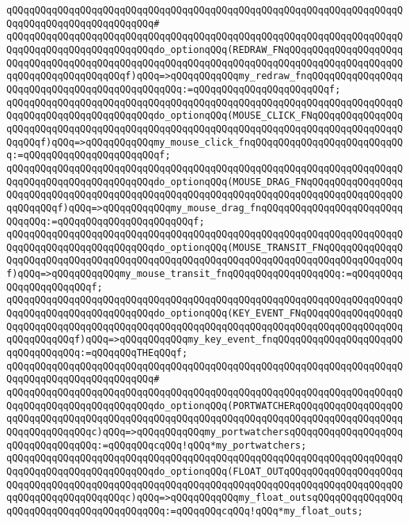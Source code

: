 \verb|qQQqqQQqqQQqqQQqqQQqqQQqqQQqqQQqqQQqqQQqqQQqqQQqqQQqqQQqqQQqqQQqqQQqqQQqqQQqqQQqqQQqqQQqqQQqqQQq#|\newline
\verb|qQQqqQQqqQQqqQQqqQQqqQQqqQQqqQQqqQQqqQQqqQQqqQQqqQQqqQQqqQQqqQQqqQQqqQQqqQQqqQQqqQQqqQQqqQQqqQQqdo_optionqQQq(REDRAW_FNqQQqqQQqqQQqqQQqqQQqqQQqqQQqqQQqqQQqqQQqqQQqqQQqqQQqqQQqqQQqqQQqqQQqqQQqqQQqqQQqqQQqqQQqqQQqqQQqqQQqqQQqqQQqqQQqf)qQQq=>qQQqqQQqqQQqmy_redraw_fnqQQqqQQqqQQqqQQqqQQqqQQqqQQqqQQqqQQqqQQqqQQqqQQq:=qQQqqQQqqQQqqQQqqQQqqQQqf;|\newline
\verb|qQQqqQQqqQQqqQQqqQQqqQQqqQQqqQQqqQQqqQQqqQQqqQQqqQQqqQQqqQQqqQQqqQQqqQQqqQQqqQQqqQQqqQQqqQQqqQQqdo_optionqQQq(MOUSE_CLICK_FNqQQqqQQqqQQqqQQqqQQqqQQqqQQqqQQqqQQqqQQqqQQqqQQqqQQqqQQqqQQqqQQqqQQqqQQqqQQqqQQqqQQqqQQqqQQqf)qQQq=>qQQqqQQqqQQqmy_mouse_click_fnqQQqqQQqqQQqqQQqqQQqqQQqqQQq:=qQQqqQQqqQQqqQQqqQQqqQQqf;|\newline
\verb|qQQqqQQqqQQqqQQqqQQqqQQqqQQqqQQqqQQqqQQqqQQqqQQqqQQqqQQqqQQqqQQqqQQqqQQqqQQqqQQqqQQqqQQqqQQqqQQqdo_optionqQQq(MOUSE_DRAG_FNqQQqqQQqqQQqqQQqqQQqqQQqqQQqqQQqqQQqqQQqqQQqqQQqqQQqqQQqqQQqqQQqqQQqqQQqqQQqqQQqqQQqqQQqqQQqqQQqf)qQQq=>qQQqqQQqqQQqmy_mouse_drag_fnqQQqqQQqqQQqqQQqqQQqqQQqqQQqqQQq:=qQQqqQQqqQQqqQQqqQQqqQQqf;|\newline
\verb|qQQqqQQqqQQqqQQqqQQqqQQqqQQqqQQqqQQqqQQqqQQqqQQqqQQqqQQqqQQqqQQqqQQqqQQqqQQqqQQqqQQqqQQqqQQqqQQqdo_optionqQQq(MOUSE_TRANSIT_FNqQQqqQQqqQQqqQQqqQQqqQQqqQQqqQQqqQQqqQQqqQQqqQQqqQQqqQQqqQQqqQQqqQQqqQQqqQQqqQQqqQQqf)qQQq=>qQQqqQQqqQQqmy_mouse_transit_fnqQQqqQQqqQQqqQQqqQQq:=qQQqqQQqqQQqqQQqqQQqqQQqf;|\newline
\verb|qQQqqQQqqQQqqQQqqQQqqQQqqQQqqQQqqQQqqQQqqQQqqQQqqQQqqQQqqQQqqQQqqQQqqQQqqQQqqQQqqQQqqQQqqQQqqQQqdo_optionqQQq(KEY_EVENT_FNqQQqqQQqqQQqqQQqqQQqqQQqqQQqqQQqqQQqqQQqqQQqqQQqqQQqqQQqqQQqqQQqqQQqqQQqqQQqqQQqqQQqqQQqqQQqqQQqqQQqf)qQQq=>qQQqqQQqqQQqmy_key_event_fnqQQqqQQqqQQqqQQqqQQqqQQqqQQqqQQqqQQq:=qQQqqQQqTHEqQQqf;|\newline
\verb|qQQqqQQqqQQqqQQqqQQqqQQqqQQqqQQqqQQqqQQqqQQqqQQqqQQqqQQqqQQqqQQqqQQqqQQqqQQqqQQqqQQqqQQqqQQqqQQq#|\newline
\verb|qQQqqQQqqQQqqQQqqQQqqQQqqQQqqQQqqQQqqQQqqQQqqQQqqQQqqQQqqQQqqQQqqQQqqQQqqQQqqQQqqQQqqQQqqQQqqQQqdo_optionqQQq(PORTWATCHERqQQqqQQqqQQqqQQqqQQqqQQqqQQqqQQqqQQqqQQqqQQqqQQqqQQqqQQqqQQqqQQqqQQqqQQqqQQqqQQqqQQqqQQqqQQqqQQqqQQqqQQqc)qQQq=>qQQqqQQqqQQqmy_portwatchersqQQqqQQqqQQqqQQqqQQqqQQqqQQqqQQqqQQq:=qQQqqQQqcqQQq!qQQq*my_portwatchers;|\newline
\verb|qQQqqQQqqQQqqQQqqQQqqQQqqQQqqQQqqQQqqQQqqQQqqQQqqQQqqQQqqQQqqQQqqQQqqQQqqQQqqQQqqQQqqQQqqQQqqQQqdo_optionqQQq(FLOAT_OUTqQQqqQQqqQQqqQQqqQQqqQQqqQQqqQQqqQQqqQQqqQQqqQQqqQQqqQQqqQQqqQQqqQQqqQQqqQQqqQQqqQQqqQQqqQQqqQQqqQQqqQQqqQQqqQQqc)qQQq=>qQQqqQQqqQQqmy_float_outsqQQqqQQqqQQqqQQqqQQqqQQqqQQqqQQqqQQqqQQqqQQq:=qQQqqQQqcqQQq!qQQq*my_float_outs;|\newline
